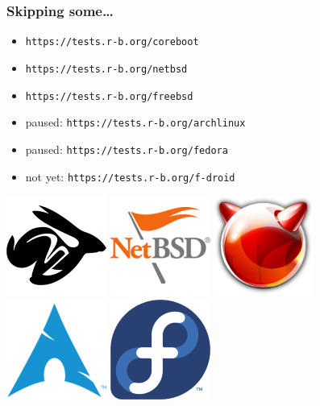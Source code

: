 \documentclass[14pt,aspectratio=169]{beamer}
\begin{document}
\begin{frame}
 \frametitle{Skipping some…}
 \begin{itemize}
  \item \texttt{https://tests.r-b.org/coreboot}
  \item \texttt{https://tests.r-b.org/netbsd}
  \item \texttt{https://tests.r-b.org/freebsd}
  \item paused: \texttt{https://tests.r-b.org/archlinux}
  \item paused: \texttt{https://tests.r-b.org/fedora}
  \item not yet: \texttt{https://tests.r-b.org/f-droid}
 \end{itemize}
 \begin{center}
  \includegraphics[height=0.13\paperheight]{images/coreboot.png}
  \hspace{0.05\paperwidth}
  \includegraphics[height=0.13\paperheight]{images/netbsd.png}
  \hspace{0.05\paperwidth}
  \includegraphics[height=0.13\paperheight]{images/freebsd.png}
  \hspace{0.05\paperwidth}
  \includegraphics[height=0.13\paperheight]{images/archlinux.png}
  \hspace{0.05\paperwidth}
  \includegraphics[height=0.13\paperheight]{images/fedora.png}
\end{center}
\end{frame}
\end{document}
